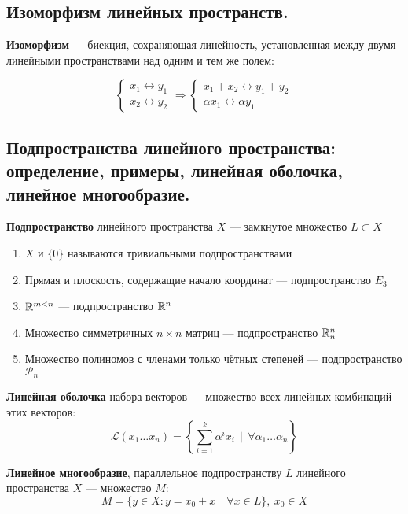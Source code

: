 \subsection{Изоморфизм линейных пространств.}
\begin{definition}
    \textbf{Изоморфизм} --- биекция, сохраняющая линейность, установленная между двумя линейными пространствами над одним и тем же полем:

    $$\begin{cases}
            x_1\leftrightarrow y_1 \\
            x_2\leftrightarrow y_2
        \end{cases} \Rightarrow \begin{cases}
            x_1+x_2\leftrightarrow y_1+y_2 \\
            \alpha x_1\leftrightarrow \alpha y_1
        \end{cases}$$
\end{definition}
\subsection{Подпространства линейного пространства: определение, примеры, линейная оболочка, линейное многообразие.}
\begin{definition}
    \textbf{Подпространство} линейного пространства $X$ --- замкнутое множество $L\subset X$
\end{definition}
\begin{example}
    \begin{enumerate}
        \item $X$ и $\{0\}$ называются тривиальными подпространствами
        \item Прямая и плоскость, содержащие начало координат --- подпространство $E_3$
        \item $\mathbb{R}^{m<n}$ --- подпространство $\mathbb{R}^n$
        \item Множество симметричных $n\times n$ матриц --- подпространство $\mathbb{R}^n_n$
        \item Множество полиномов с членами только чётных степеней --- подпространство $\mathcal{P}_n$
    \end{enumerate}
\end{example}
\begin{definition}
    \textbf{Линейная оболочка} набора векторов --- множество всех линейных комбинаций этих векторов: $$\mathcal{L}(x_1\ldots x_n)=\left\{\sum\limits_{i=1}^k \alpha^ix_i \ \ |\ \ \forall \alpha_1\ldots \alpha_n\right\}$$
\end{definition}
\begin{definition}
    \textbf{Линейное многообразие}, параллельное подпространству $L$ линейного пространства $X$ --- множество $M$: $$M=\{y\in X : y=x_0+x \quad \forall x\in L\},\ x_0\in X$$
\end{definition}
